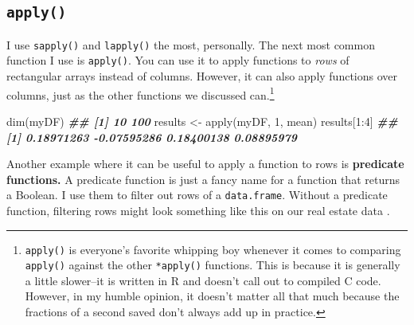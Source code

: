 \documentclass[
  12pt,
  krantz2]{krantz}
\makeatletter
\newenvironment{Shaded}{\begin{snugshade}}{\end{snugshade}}
\newcommand{\DecValTok}[1]{\textcolor[rgb]{0.06,0.06,0.06}{#1}}
\newcommand{\DocumentationTok}[1]{\textcolor[rgb]{0.37,0.37,0.37}{\textbf{\textit{#1}}}}
\newcommand{\FunctionTok}[1]{\textcolor[rgb]{0,0,0}{#1}}
\newcommand{\NormalTok}[1]{#1}
\newcommand{\OtherTok}[1]{\textcolor[rgb]{0.37,0.37,0.37}{#1}}
\newcommand{\SpecialCharTok}[1]{\textcolor[rgb]{0,0,0}{#1}}
\newenvironment{kframe}{%
\medskip{}
\setlength{\fboxsep}{.8em}
 \def\at@end@of@kframe{}%
 \ifinner\ifhmode%
  \def\at@end@of@kframe{\end{minipage}}%
  \begin{minipage}{\columnwidth}%
 \fi\fi%
 \def\FrameCommand##1{\hskip\@totalleftmargin \hskip-\fboxsep
 \colorbox{shadecolor}{##1}\hskip-\fboxsep
     \hskip-\linewidth \hskip-\@totalleftmargin \hskip\columnwidth}%
 \MakeFramed {\advance\hsize-\width
   \@totalleftmargin\z@ \linewidth\hsize
   \@setminipage}}%
 {\par\unskip\endMakeFramed%
 \at@end@of@kframe}
\renewenvironment{Shaded}{\begin{kframe}}{\end{kframe}}
\makeatother
\begin{document}
\hypertarget{apply}{%
\subsection{\texorpdfstring{\texttt{apply()}}{apply()}}\label{apply}}

I use \texttt{sapply()} and \texttt{lapply()} the most, personally. The next most common function I use is \texttt{apply()}. You can use it to apply functions to \emph{rows} of rectangular arrays instead of columns. However, it can also apply functions over columns, just as the other functions we discussed can.\footnote{\texttt{apply()} is everyone's favorite whipping boy whenever it comes to comparing \texttt{apply()} against the other \texttt{*apply()} functions. This is because it is generally a little slower--it is written in R and doesn't call out to compiled C code. However, in my humble opinion, it doesn't matter all that much because the fractions of a second saved don't always add up in practice.}

\begin{Shaded}
\begin{Highlighting}[]
\FunctionTok{dim}\NormalTok{(myDF)}
\DocumentationTok{\#\# [1]  10 100}
\NormalTok{results }\OtherTok{\textless{}{-}} \FunctionTok{apply}\NormalTok{(myDF, }\DecValTok{1}\NormalTok{, mean)}
\NormalTok{results[}\DecValTok{1}\SpecialCharTok{:}\DecValTok{4}\NormalTok{]}
\DocumentationTok{\#\# [1]  0.18971263 {-}0.07595286  0.18400138  0.08895979}
\end{Highlighting}
\end{Shaded}

Another example where it can be useful to apply a function to rows is \textbf{predicate functions.} A predicate function is just a fancy name for a function that returns a Boolean. I use them to filter out rows of a \texttt{data.frame}. Without a predicate function, filtering rows might look something like this on our real estate data \citep{albemarle_county_gis_web} \citep{clay_ford}.
\end{document}
